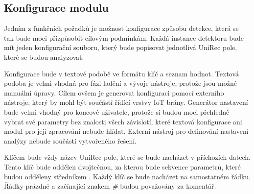  \subsection{Konfigurace modulu} \label{config_file}
 Jedním z funkčních požadků je možnost konfigurace způsobu detekce, která se tak bude moci přizpůsobit 
 cílovým podmínkám. Každá instance detektoru bude mít jeden konfigurační souboru, který bude 
 popisovat jednotlivá UniRec pole, které se budou analyzovat. 
 
 Konfigurace bude v textové podobě ve formátu klíč a seznam hodnot. Textová podoba je velmi vhodná pro 
 fázi ladění a vývoje nástroje, protože jsou možné manuální úpravy. Cílem ovšem je generovat 
 konfiguraci pomocí externího nástroje, který by mohl být součástí řídící vrstvy IoT brány. Generátor
 nastavení bude velmi vhodný pro koncové uživatele, protože si budou moci přehledně vybrat své
 parametry bez znalosti všech závislotí, které textová konfigurace ani modul pro její zpracování 
 nebude hlídat. Externí nástroj pro definování nastavení analýzy nebude součástí vytvořeného řešení.
 
 Klíčem bude vždy název UniRec pole, které se bude nacházet v příchozích datech. Tento klíč bude 
 oddělen dvojtečnou, za kterou bude sekvence parametrů, které budou odděleny středníkem . Každý klíč
 se bude nacházet na samostatném řádku. Řádky prázdné a začínající znakem \textit{\#} budou
 považovány za komentář. 
 
